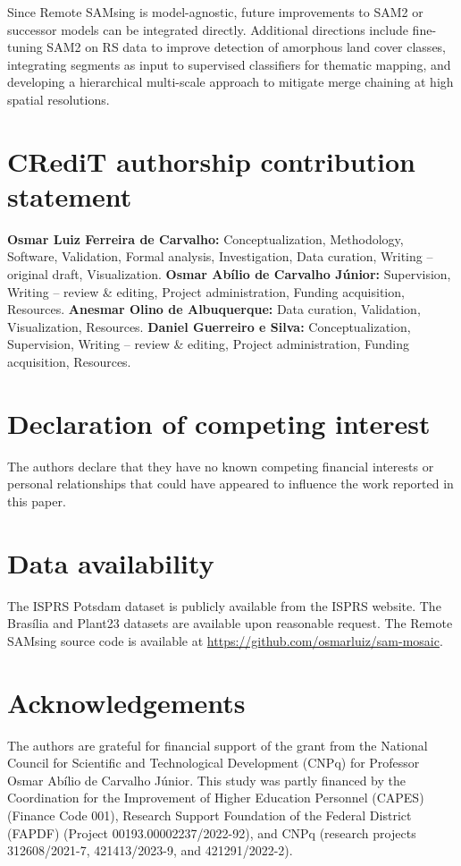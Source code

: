 \documentclass[review,11pt,authoryear]{elsarticle}
\begin{document}
Since Remote SAMsing is model-agnostic, future improvements to SAM2 or successor models can be integrated directly. Additional directions include fine-tuning SAM2 on RS data to improve detection of amorphous land cover classes, integrating segments as input to supervised classifiers for thematic mapping, and developing a hierarchical multi-scale approach to mitigate merge chaining at high spatial resolutions.


\section*{CRediT authorship contribution statement}
\textbf{Osmar Luiz Ferreira de Carvalho:} Conceptualization, Methodology, Software, Validation, Formal analysis, Investigation, Data curation, Writing -- original draft, Visualization. \textbf{Osmar Ab\'{i}lio de Carvalho J\'{u}nior:} Supervision, Writing -- review \& editing, Project administration, Funding acquisition, Resources. \textbf{Anesmar Olino de Albuquerque:} Data curation, Validation, Visualization, Resources. \textbf{Daniel Guerreiro e Silva:} Conceptualization, Supervision, Writing -- review \& editing, Project administration, Funding acquisition, Resources.

\section*{Declaration of competing interest}
The authors declare that they have no known competing financial interests or personal relationships that could have appeared to influence the work reported in this paper.

\section*{Data availability}
The ISPRS Potsdam dataset is publicly available from the ISPRS website. The Bras\'{i}lia and Plant23 datasets are available upon reasonable request. The Remote SAMsing source code is available at \url{https://github.com/osmarluiz/sam-mosaic}.

\section*{Acknowledgements}
The authors are grateful for financial support of the grant from the National Council for Scientific and Technological Development (CNPq) for Professor Osmar Ab\'{i}lio de Carvalho J\'{u}nior. This study was partly financed by the Coordination for the Improvement of Higher Education Personnel (CAPES) (Finance Code 001), Research Support Foundation of the Federal District (FAPDF) (Project 00193.00002237/2022-92), and CNPq (research projects 312608/2021-7, 421413/2023-9, and 421291/2022-2).



\end{document}
